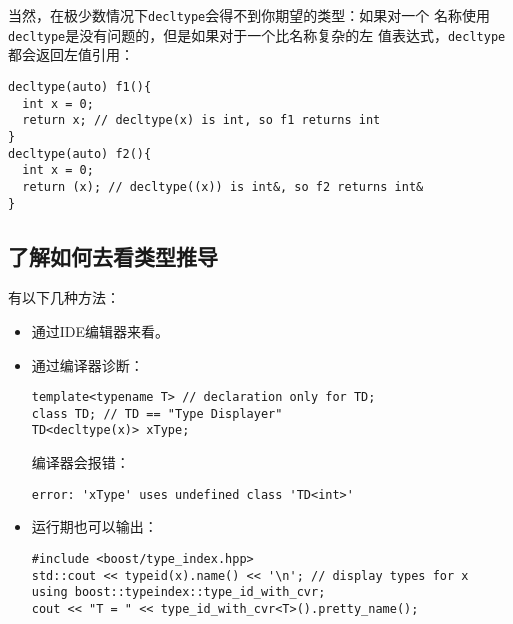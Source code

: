 当然，在极少数情况下\texttt{decltype}会得不到你期望的类型：如果对一个
名称使用\texttt{decltype}是没有问题的，但是如果对于一个比名称复杂的左
值表达式，\texttt{decltype}都会返回左值引用：
\begin{verbatim}
decltype(auto) f1(){
  int x = 0;
  return x; // decltype(x) is int, so f1 returns int
}
decltype(auto) f2(){
  int x = 0;
  return (x); // decltype((x)) is int&, so f2 returns int&
}
\end{verbatim}

\subsection{了解如何去看类型推导}
\label{sec:Item2-4}

有以下几种方法：
\begin{itemize}
\item 通过IDE编辑器来看。
\item 通过编译器诊断：
\begin{verbatim}
template<typename T> // declaration only for TD;
class TD; // TD == "Type Displayer"
TD<decltype(x)> xType;
\end{verbatim}
  编译器会报错：
\begin{verbatim}
error: 'xType' uses undefined class 'TD<int>'
\end{verbatim}
\item 运行期也可以输出：
\begin{verbatim}
#include <boost/type_index.hpp>
std::cout << typeid(x).name() << '\n'; // display types for x
using boost::typeindex::type_id_with_cvr;
cout << "T = " << type_id_with_cvr<T>().pretty_name();
\end{verbatim}
\end{itemize}
